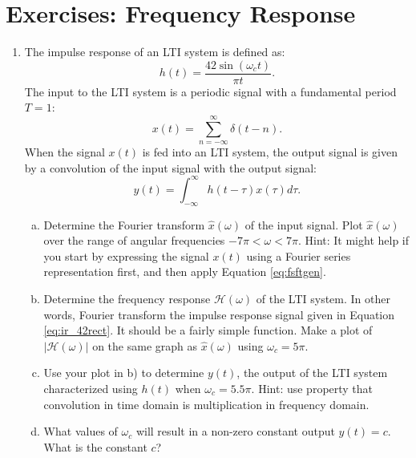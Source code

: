 \newpage
\section{Exercises: Frequency Response}

\begin{enumerate}

\item The impulse response of an LTI system is defined as:
\begin{equation}
    h(t) = \frac{42\sin(\omega_c t)}{\pi t}.
    \label{eq:ir_42rect}
\end{equation}
The input to the LTI system is a periodic signal with a fundamental period $T=1$:
\begin{equation}
    x(t) = \sum_{n=-\infty}^{\infty}\delta(t-n).
\end{equation}
When the signal $x(t)$ is fed into an LTI system, the output signal is given by a convolution of the input signal with the output signal:
\begin{equation}
    y(t) = \int_{-\infty}^{\infty} h(t-\tau)x(\tau) d\tau.
\end{equation}
\begin{enumerate}[a)]
\item Determine the Fourier transform $\hat{x}(\omega)$ of the input signal. Plot $\hat{x}(\omega)$ over the range of angular frequencies $-7\pi < \omega < 7\pi$. Hint: It might help if you start by expressing the signal $x(t)$ using a Fourier series representation first, and then apply Equation \ref{eq:fsftgen}.
\item Determine the frequency response $\mathcal{H}(\omega)$ of the LTI system. In other words, Fourier transform the impulse response signal given in Equation \ref{eq:ir_42rect}. It should be a fairly simple function. Make a plot of $|\mathcal{H}(\omega)|$ on the same graph as $\hat{x}(\omega)$ using $\omega_c = 5\pi$.
\item Use your plot in b) to determine $y(t)$, the output of the LTI system characterized using $h(t)$ when $\omega_c=5.5\pi$. Hint: use property that convolution in time domain is multiplication in frequency domain.
\item What values of $\omega_c$ will result in a non-zero constant output $y(t)=c$. What is the constant $c$?
\end{enumerate}


\end{enumerate}
